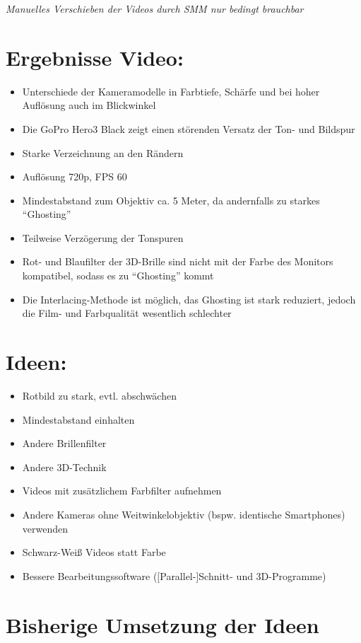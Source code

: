 \emph{Manuelles Verschieben der Videos durch SMM nur bedingt brauchbar}


\section{Ergebnisse Video:}

\begin{itemize}
	\item Unterschiede der Kameramodelle in Farbtiefe, Schärfe und bei hoher Auflösung auch im Blickwinkel 
	\item Die GoPro Hero3 Black zeigt einen störenden Versatz der Ton- und Bildspur
	\item Starke Verzeichnung an den Rändern
	\item Auflösung 720p, FPS 60
  \item Mindestabstand zum Objektiv ca. 5 Meter, da andernfalls zu starkes \enquote{Ghosting}
	\item Teilweise Verzögerung der Tonspuren
	\item Rot- und Blaufilter der 3D-Brille sind nicht mit der Farbe des Monitors kompatibel, sodass es zu "`Ghosting"' kommt
	\item Die Interlacing-Methode ist möglich, das Ghosting ist stark reduziert, jedoch die Film- und Farbqualität wesentlich schlechter
\end{itemize}

\section{Ideen:}
\begin{itemize}
	\item Rotbild zu stark, evtl. abschwächen
	\item Mindestabstand einhalten
	\item Andere Brillenfilter
	\item Andere 3D-Technik
	\item Videos mit zusätzlichem Farbfilter aufnehmen
	\item Andere Kameras ohne Weitwinkelobjektiv (bspw. identische Smartphones) verwenden
	\item Schwarz-Weiß Videos statt Farbe
	\item Bessere Bearbeitungssoftware ([Parallel-]Schnitt- und 3D-Programme)
\end{itemize}


\section{Bisherige Umsetzung der Ideen}

